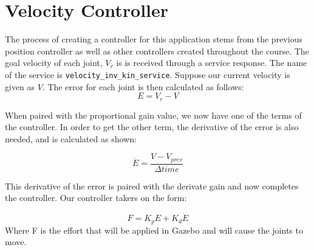 \documentclass{article}
\begin{document}
\section{Velocity Controller}

The process of creating a controller for this application stems from the previous
position controller as well as other controllers created throughout the course.
The goal velocity of each joint, $V_r$ is is received through a service response.
The name of the service is \lstinline{velocity_inv_kin_service}. Suppose our current
velocity is given as $V$.
The error for each joint is then calculated as follows:
\[
    E = V_r - V
\]

When paired with the proportional gain value, we now have one of the terms of the controller. In order to get the other term, the derivative of the error is also needed, and is calculated as shown: 

\[
    \dot{E} = \frac{V - V_{prev}}{\Delta time}
\]

This derivative of the error is paired with the derivate gain and now completes the controller. Our controller takers on the form: 

\[
    F = K_p E + K_d \dot{E}
\]
Where F is the effort that will be applied in Gazebo and will cause the joints to move.
\end{document}
